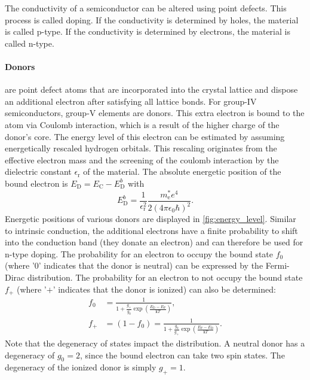 The conductivity of a semiconductor can be altered using
point defects.
This process is called doping.
If the conductivity is determined by holes, the material is
called p-type.
If the conductivity is determined by electrons, the material
is called n-type.

\paragraph{Donors} are point defect atoms that are incorporated into the crystal
lattice and dispose an additional electron after satisfying all
lattice bonds.
For group-$\mathrm{IV}$ semiconductors, group-$\mathrm{V}$ elements
are donors.
This extra electron is bound to the atom via Coulomb interaction,
which is a result of the higher charge of the donor's core.
The energy level of this electron can be estimated by assuming
energetically rescaled hydrogen orbitals.
This rescaling originates from the effective electron mass and
the screening of the coulomb interaction by the dielectric constant 
$\epsilon_{\mathrm{r}}$ of the material.
The absolute energetic position of the bound electron is
$E_{\mathrm{D}}=E_{\mathrm{C}}-E_{\mathrm{D}}^{b}$ with
\begin{equation}
	E_{\mathrm{D}}^{b}=
	\frac{1}{\epsilon_{\mathrm{r}}^{2}}
	\frac{m_{\mathrm{e}}^{*} e^{4}}{2(4\pi\epsilon_{0}\hbar)^{2}}.
\end{equation}
Energetic positions of various donors are displayed in
\cref{fig:energy_level}.
Similar to intrinsic conduction, the additional electrons have a
finite probability to shift into the conduction band
(they donate an electron) and
can therefore be used for n-type doping.
The probability for an electron to occupy the bound state $f_0$
(where '$0$' indicates that the donor is neutral) can be expressed
by the Fermi-Dirac distribution.
The probability for an electron to not occupy the bound state $f_+$
(where '$+$' indicates that the donor is ionized) can also be
determined:
\begin{align}
	f_{0} & =\frac{1}{1+\frac{g_{+}}{g_{0}}\exp\left(
	\frac{E_{\mathrm{D}}-E_{\mathrm{F}}}{\mathrm{k}T}\right)},  \\
	\label{eq:fplus}
	f_{+} & =(1-f_{0})=\frac{1}{1+\frac{g_{0}}{g_{+}}\exp\left(
		\frac{E_{\mathrm{F}}-E_{\mathrm{D}}}{\mathrm{k}T} \right)}.
\end{align}
Note that the degeneracy of states impact the distribution.
A neutral donor has a degeneracy of $g_0=2$, since the bound
electron can take two spin states. 
The degeneracy of the ionized donor is simply $g_+=1$.

